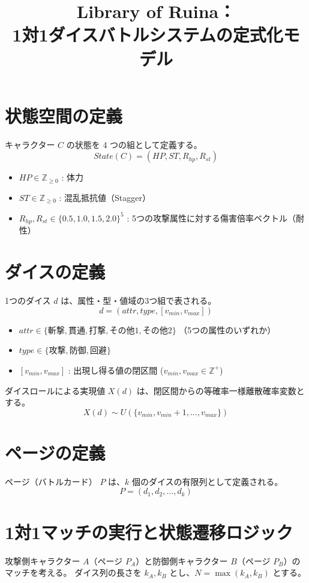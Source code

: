 \documentclass{article}
\title{Library of Ruina：\\1対1ダイスバトルシステムの定式化モデル}
\date{}
\begin{document}
\maketitle

\section{状態空間の定義}
キャラクター $C$ の状態を 4 つの組として定義する。
\[
State(C) = (HP, ST, R_{hp}, R_{st})
\]
\begin{itemize}
    \item $HP \in \mathbb{Z}_{\ge 0}$ : 体力
    \item $ST \in \mathbb{Z}_{\ge 0}$ : 混乱抵抗値（Stagger）
    \item $R_{hp}, R_{st} \in \{0.5, 1.0, 1.5, 2.0\}^5$ : 5つの攻撃属性に対する傷害倍率ベクトル（耐性）
\end{itemize}

\section{ダイスの定義}
1つのダイス $d$ は、属性・型・値域の3つ組で表される。
\[
d = (attr, type, [v_{min}, v_{max}])
\]
\begin{itemize}
    \item $attr \in \{\text{斬撃}, \text{貫通}, \text{打撃}, \text{その他1}, \text{その他2}\}$ （5つの属性のいずれか）
    \item $type \in \{\text{攻撃}, \text{防御}, \text{回避}\}$
    \item $[v_{min}, v_{max}]$ : 出現し得る値の閉区間 ($v_{min}, v_{max} \in \mathbb{Z}^+$)
\end{itemize}

ダイスロールによる実現値 $X(d)$ は、閉区間からの等確率一様離散確率変数とする。
\[
X(d) \sim U(\{v_{min}, v_{min}+1, \dots, v_{max}\})
\]

\section{ページの定義}
ページ（バトルカード） $P$ は、$k$ 個のダイスの有限列として定義される。
\[
P = (d_1, d_2, \dots, d_k)
\]

\section{1対1マッチの実行と状態遷移ロジック}
攻撃側キャラクター $A$（ページ $P_A$）と防御側キャラクター $B$（ページ $P_B$）のマッチを考える。
ダイス列の長さを $k_A, k_B$ とし、$N = \max(k_A, k_B)$ とする。
\end{document}
